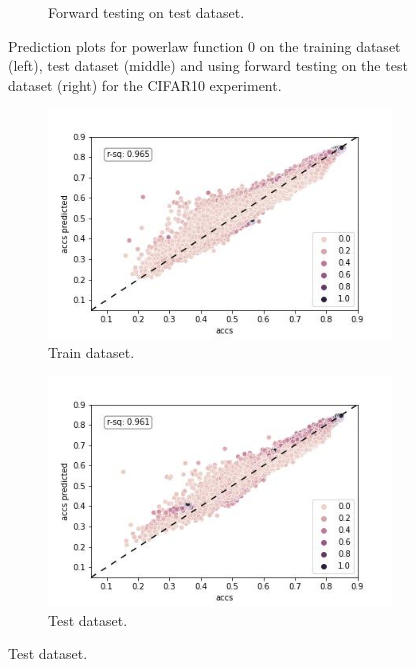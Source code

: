 \documentclass{article} %
\begin{document}
\begin{figure}
\begin{subfigure}{.33\textwidth}
        \caption{Forward testing on test dataset.}
        \label{fig:powerlaw_acc_classes_linear_epoch_linear_forward_val}
    \end{subfigure}
    \caption{Prediction plots for powerlaw function 0 on the training dataset (left), test dataset (middle) and using forward testing on the test dataset (right) for the CIFAR10 experiment.}
    \label{fig:powerlaw_prediction_plot_fct_0}
\end{figure}



\begin{figure}
    \begin{subfigure}{.33\textwidth}
        \centering
        \includegraphics[width=.8\linewidth]{cifar10/powerlaw_all_epochs_accs_hat_classes_arctan_epoch_artan.jpg}
        \caption{Train dataset.}
        \label{fig:powerlaw_acc_classes_arctan_epoch_artan_train}
    \end{subfigure}%
    \begin{subfigure}{.33\textwidth}
        \centering
        \includegraphics[width=.8\linewidth]{cifar10/powerlaw_all_epochs_accs_hat_classes_arctan_epoch_artan_val.jpg}
        \caption{Test dataset.}
        \label{fig:powerlaw_acc_classes_arctan_epoch_artan_val}

\end{subfigure}
\end{figure}
\end{document}

